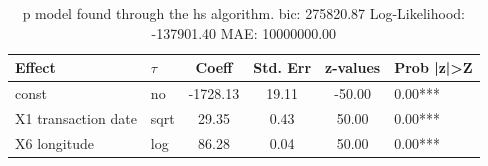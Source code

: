 \begin{table}
	\caption{p model found through the hs algorithm. bic: 275820.87 Log-Likelihood: -137901.40 MAE: 10000000.00}
	\begin{center}
		\begin{tabular}{|l|l|c|c|c|l|}
			\hline
			Effect & $\tau$ & Coeff & Std. Err & z-values & Prob |z|>Z \\
			\hline
			const & no & -1728.13 & 19.11 & -50.00 & 0.00*** \\
			\hline
			X1 transaction date & sqrt & 29.35 & 0.43 & 50.00 & 0.00*** \\
			\hline
			X6 longitude & log & 86.28 & 0.04 & 50.00 & 0.00*** \\
			\hline
		\end{tabular}
	\end{center}
\end{table}